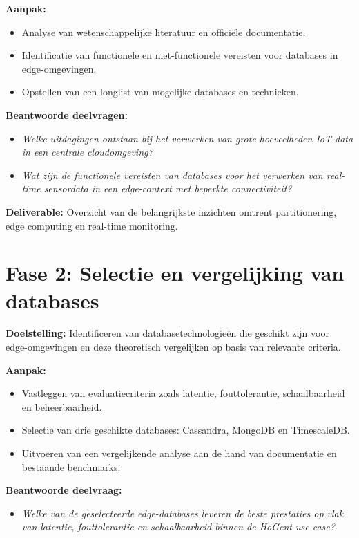 \textbf{Aanpak:}
\begin{itemize}
    \item Analyse van wetenschappelijke literatuur en officiële documentatie.
    \item Identificatie van functionele en niet-functionele vereisten voor databases in edge-omgevingen.
    \item Opstellen van een longlist van mogelijke databases en technieken.
\end{itemize}

\textbf{Beantwoorde deelvragen:}
\begin{itemize}
    \item \emph{Welke uitdagingen ontstaan bij het verwerken van grote hoeveelheden IoT-data in een centrale cloudomgeving?}
    \item \emph{Wat zijn de functionele vereisten van databases voor het verwerken van real-time sensordata in een edge-context met beperkte connectiviteit?}
\end{itemize}

\textbf{Deliverable:} Overzicht van de belangrijkste inzichten omtrent partitionering, edge computing en real-time monitoring.\\

\section*{Fase 2: Selectie en vergelijking van databases}

\textbf{Doelstelling:}  
Identificeren van databasetechnologieën die geschikt zijn voor edge-omgevingen en deze theoretisch vergelijken op basis van relevante criteria.

\textbf{Aanpak:}
\begin{itemize}
    \item Vastleggen van evaluatiecriteria zoals latentie, fouttolerantie, schaalbaarheid en beheerbaarheid.
    \item Selectie van drie geschikte databases: Cassandra, MongoDB en TimescaleDB.
    \item Uitvoeren van een vergelijkende analyse aan de hand van documentatie en bestaande benchmarks.
\end{itemize}

\textbf{Beantwoorde deelvraag:}
\begin{itemize}
    \item \emph{Welke van de geselecteerde edge-databases leveren de beste prestaties op vlak van latentie, fouttolerantie en schaalbaarheid binnen de HoGent-use case?}
\end{itemize}

